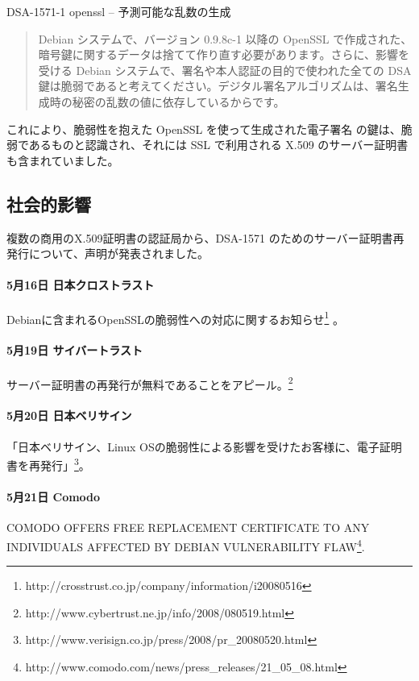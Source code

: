 \documentclass[mingoth,a4paper]{jsarticle}
\begin{document}
\begin{description}
\item{DSA-1571-1 openssl -- 予測可能な乱数の生成}\cite{DSA-1571}
\par
\begin{quotation}
Debian システムで、バージョン 0.9.8c-1 以降の OpenSSL で作成された、暗号鍵に関するデータは捨てて作り直す必要があります。さらに、影響を受ける Debian システムで、署名や本人認証の目的で使われた全ての DSA 鍵は脆弱であると考えてください。デジタル署名アルゴリズムは、署名生成時の秘密の乱数の値に依存しているからです。
\end{quotation}

\end{description}

これにより、脆弱性を抱えた OpenSSL を使って生成された電子署名
の鍵は、脆弱であるものと認識され、それには SSL で利用される
X.509 のサーバー証明書も含まれていました。

\subsection{社会的影響}

複数の商用のX.509証明書の認証局から、DSA-1571 のためのサーバー証明書再発行について、声明が発表されました。

 \paragraph{5月16日 日本クロストラスト}  Debianに含まれるOpenSSLの脆弱性への対応に関するお知らせ\footnote{http://crosstrust.co.jp/company/information/i20080516} 。

   \paragraph{5月19日 サイバートラスト} サーバー証明書の再発行が無料であることをアピール。\footnote{http://www.cybertrust.ne.jp/info/2008/080519.html} 

  \paragraph{5月20日 日本ベリサイン} 「日本ベリサイン、Linux OSの脆弱性による影響を受けたお客様に、電子証明書を再発行」\footnote{http://www.verisign.co.jp/press/2008/pr\_20080520.html}。

  \paragraph{5月21日 Comodo } COMODO OFFERS FREE REPLACEMENT CERTIFICATE TO ANY INDIVIDUALS AFFECTED BY DEBIAN VULNERABILITY FLAW\footnote{http://www.comodo.com/news/press\_releases/21\_05\_08.html}.
  
\end{document}
